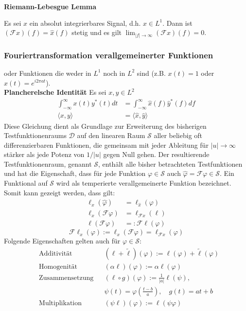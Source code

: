 \smallskip

\textbf{Riemann-Lebesgue Lemma}

Es sei $x$ ein absolut integrierbares Signal, d.h. $x \in L^1$. Dann ist $(\mathcal{F}x)(f)=\hat{x}(f)$ stetig und es gilt $\lim_{|f|\to\infty}(\mathcal{F}x)(f)=0$.

\subsubsection{Fouriertransformation verallgemeinerter Funktionen}
oder Funktionen die weder in $L^1$ noch in $L^2$ sind (z.B. $x(t)=1$ oder $x(t)=e^{i2\pi at}$).
\\
\textbf{Plancherelsche Identität}
Es sei $x,y \in L^2$
\begin{align*}
    \int_{-\infty}^\infty x(t)y^*(t)dt&=\int_{-\infty}^\infty\hat{x}(f)\hat{y}^*(f)df \\
    \langle x,y\rangle &= \langle\hat{x},\hat{y}\rangle
\end{align*}
Diese Gleichung dient als Grundlage zur Erweiterung des bisherigen Testfunktionenraums $\mathcal{D}$ auf den linearen Raum $\mathcal{S}$ aller beliebig oft differenzierbaren Funktionen, die gemeinsam mit jeder Ableitung für $|u| \rightarrow \infty$ stärker als jede Potenz von $1/|u|$ gegen Null gehen. Der resultierende Testfunktionenraum, genannt $\mathcal{S}$, enthält alle bisher betrachteten Testfunktionen und hat die Eigenschaft, dass für jede Funktion $\varphi \in \mathcal{S}$ auch $\hat{\varphi} = \mathcal{F}\varphi \in \mathcal{S}$. Ein Funktional auf $\mathcal{S}$ wird als temperierte verallgemeinerte Funktion bezeichnet.
Somit kann gezeigt werden, dass gilt:
\begin{align*}
    \ell_x(\hat{\varphi})&=\ell_{\hat{x}}(\varphi) \\
    \ell_x(\mathcal{F}\varphi)&=\ell_{\mathcal{F}x}(\ell) \\
    \ell(\mathcal{F}\varphi)&=:\mathcal{F}\ell(\varphi)
\end{align*}
\begin{equation*}
    \mathcal{F}\ell_x(\varphi):=\ell_x(\mathcal{F}\varphi)=\ell_{\mathcal{F}x}(\varphi)
\end{equation*}
Folgende Eigenschaften gelten auch für $\varphi \in \mathcal{S}$:
\begin{align*}
    &\text{Additivität}&& (\ell+\widetilde{\ell})(\varphi):=\ell(\varphi)+\widetilde{\ell}(\varphi)  \\
    &\text{Homogenität}&& (\alpha\ell)(\varphi):=\alpha\ell(\varphi) \\
    &\text{Zusammensetzung}&& (\ell\circ g)(\varphi):=\frac{1}{|a|}\ell(\psi), \\
    & &&\psi(t)=\varphi\!\left(\frac{t-b}{a}\right),\quad g(t)=at+b  \\
    &\text{Multiplikation}&& (\psi\ell)(\varphi):=\ell(\psi\varphi)
\end{align*}    
